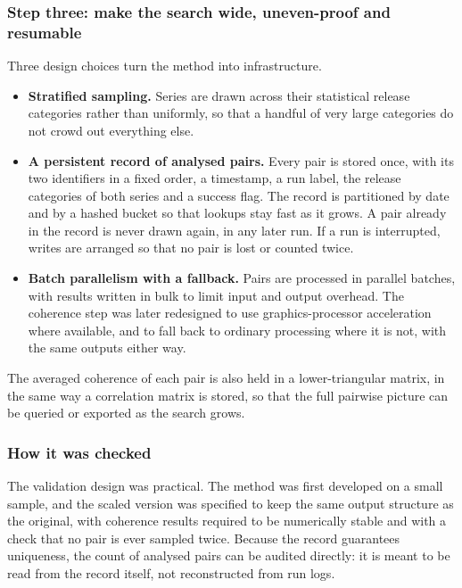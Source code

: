 \documentclass[
  british,
  a4paper,
]{article}
\providecommand{\tightlist}{%
  \setlength{\itemsep}{0pt}\setlength{\parskip}{0pt}}
\begin{document}
\subsubsection{Step three: make the search wide, uneven-proof and
resumable}\label{step-three-make-the-search-wide-uneven-proof-and-resumable}

Three design choices turn the method into infrastructure.

\begin{itemize}
\tightlist
\item
  \textbf{Stratified sampling.} Series are drawn across their
  statistical release categories rather than uniformly, so that a
  handful of very large categories do not crowd out everything else.
\item
  \textbf{A persistent record of analysed pairs.} Every pair is stored
  once, with its two identifiers in a fixed order, a timestamp, a run
  label, the release categories of both series and a success flag. The
  record is partitioned by date and by a hashed bucket so that lookups
  stay fast as it grows. A pair already in the record is never drawn
  again, in any later run. If a run is interrupted, writes are arranged
  so that no pair is lost or counted twice.
\item
  \textbf{Batch parallelism with a fallback.} Pairs are processed in
  parallel batches, with results written in bulk to limit input and
  output overhead. The coherence step was later redesigned to use
  graphics-processor acceleration where available, and to fall back to
  ordinary processing where it is not, with the same outputs either way.
\end{itemize}

The averaged coherence of each pair is also held in a lower-triangular
matrix, in the same way a correlation matrix is stored, so that the full
pairwise picture can be queried or exported as the search grows.

\subsubsection{How it was checked}\label{how-it-was-checked}

The validation design was practical. The method was first developed on a
small sample, and the scaled version was specified to keep the same
output structure as the original, with coherence results required to be
numerically stable and with a check that no pair is ever sampled twice.
Because the record guarantees uniqueness, the count of analysed pairs
can be audited directly: it is meant to be read from the record itself,
not reconstructed from run logs.
\end{document}
